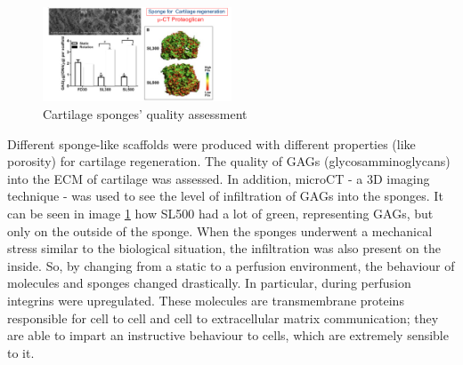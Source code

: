 	\begin{figure}[ht]
		\centering
		\includegraphics[width=0.5\textwidth]{sponge.png}
		\caption{Cartilage sponges' quality assessment}
		\label{fig:matrixome}
	\end{figure}

	Different sponge-like scaffolds were produced with different properties (like porosity) for cartilage regeneration.
	The quality of GAGs (glycosamminoglycans) into the ECM of cartilage was assessed.
	In addition, microCT - a 3D imaging technique - was used to see the level of infiltration of GAGs into the sponges.
	It can be seen in image \ref{fig:matrixome} how SL500 had a lot of green, representing GAGs, but only on the outside of the sponge.
	When the sponges underwent a mechanical stress similar to the biological situation, the infiltration was also present on the inside.
	So, by changing from a static to a perfusion environment, the behaviour of molecules and sponges changed drastically.
	In particular, during perfusion integrins were upregulated.
	These molecules are transmembrane proteins responsible for cell to cell and cell to extracellular matrix communication; they are able to impart an instructive behaviour to cells, which are extremely sensible to it.
